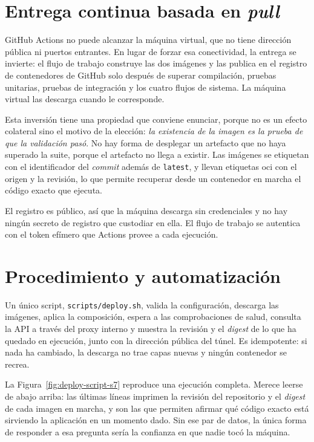 \section{Entrega continua basada en \emph{pull}}

GitHub Actions no puede alcanzar la máquina virtual, que no tiene dirección pública ni puertos entrantes. En lugar de forzar esa conectividad, la entrega se invierte: el flujo de trabajo construye las dos imágenes y las publica en el registro de contenedores de GitHub solo después de superar compilación, pruebas unitarias, pruebas de integración y los cuatro flujos de sistema. La máquina virtual las descarga cuando le corresponde.

Esta inversión tiene una propiedad que conviene enunciar, porque no es un efecto colateral sino el motivo de la elección: \emph{la existencia de la imagen es la prueba de que la validación pasó}. No hay forma de desplegar un artefacto que no haya superado la suite, porque el artefacto no llega a existir. Las imágenes se etiquetan con el identificador del \emph{commit} además de \texttt{latest}, y llevan etiquetas \gls{oci} con el origen y la revisión, lo que permite recuperar desde un contenedor en marcha el código exacto que ejecuta.

El registro es público, así que la máquina descarga sin credenciales y no hay ningún secreto de registro que custodiar en ella. El flujo de trabajo se autentica con el token efímero que Actions provee a cada ejecución.

\section{Procedimiento y automatización}

Un único script, \texttt{scripts/deploy.sh}, valida la configuración, descarga las imágenes, aplica la composición, espera a las comprobaciones de salud, consulta la API a través del proxy interno y muestra la revisión y el \emph{digest} de lo que ha quedado en ejecución, junto con la dirección pública del túnel. Es idempotente: si nada ha cambiado, la descarga no trae capas nuevas y ningún contenedor se recrea.

La Figura~\ref{fig:deploy-script-s7} reproduce una ejecución completa. Merece leerse de abajo arriba: las últimas líneas imprimen la revisión del repositorio y el \emph{digest} de cada imagen en marcha, y son las que permiten afirmar qué código exacto está sirviendo la aplicación en un momento dado. Sin ese par de datos, la única forma de responder a esa pregunta sería la confianza en que nadie tocó la máquina.

